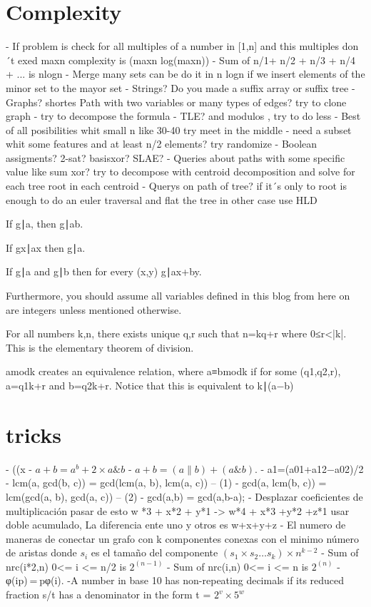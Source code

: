 \section{Complexity}

- If problem is check for all multiples of a number in [1,n] and this multiples don´t exed maxn complexity is (maxn log(maxn))
- Sum of n/1+ n/2 + n/3 + n/4 + ... is nlogn
- Merge many sets can be do it in n logn if we insert elements of the minor set to the mayor set
- Strings? Do you made a suffix array or suffix tree
- Graphs? shortes Path with two variables or many types of edges? try to clone graph
- try to decompose the formula
- TLE? and modulos , try to do less %
- Best of all posibilities whit small n like 30-40 try meet in the middle
- need a subset whit some features and at least n/2 elements? try randomize
- Boolean assigments?  2-sat? basisxor? SLAE?
- Queries about paths with some specific value like sum xor? try to decompose with centroid decomposition and solve for each tree root in each centroid 
- Querys on path of tree? if it´s only to root is enough to do an euler traversal and flat the tree in other case use HLD

If g∣a, then g∣ab.

If gx∣ax then g∣a.

If g∣a and g∣b then for every (x,y) g∣ax+by.

Furthermore, you should assume all variables defined in this blog from here on are integers unless mentioned otherwise.

For all numbers k,n, there exists unique q,r such that n=kq+r where 0≤r<|k|. This is the elementary theorem of division.

amodk creates an equivalence relation, where a≡bmodk if for some (q1,q2,r), a=q1k+r and b=q2k+r. Notice that this is equivalent to k∣(a−b)

\section{tricks}
- ((x %
- $a+b = a^b + 2 \times a\&b$
- $a+b= (a \| b)+(a \& b)$.
- a1=(a01+a12−a02)/2
- lcm(a, gcd(b, c)) = gcd(lcm(a, b), lcm(a, c)) -- (1)
- gcd(a, lcm(b, c)) = lcm(gcd(a, b), gcd(a, c)) -- (2)
- gcd(a,b) = gcd(a,b-a);
- Desplazar coeficientes de multiplicación pasar de esto w *3 + x*2 + y*1 -> w*4 + x*3 +y*2 +z*1 usar doble acumulado,
  La diferencia ente uno y otros es w+x+y+z
- El numero de maneras de conectar un grafo con k componentes conexas con el minimo número de aristas
  donde $s_i$ es el tamaño del componente  $( s_1 \times s_2 \dots s_k ) \times  n^{k -2}$
- Sum of nrc(i*2,n) 0<= i <= n/2 is $2^(n-1)$
- Sum of nrc(i,n) 0<= i <= n is $2^(n)$
- φ(ip) = pφ(i).
-A number in base 10 has non-repeating decimals if its reduced fraction s/t has a denominator in the form t = ${2^{v}} \times {5^{w}}$






